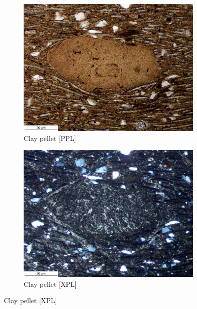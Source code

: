 \documentclass[a4paper]{article}
\begin{document}
\begin{figure}[H]
\begin{subfigure}[t]{.49\textwidth}
		\includegraphics[width=\textwidth]{ThinSections/55_10x_PPL.jpg}
		\caption{Clay pellet [PPL]}
	\end{subfigure}\hspace{.5em}\hfill
	\begin{subfigure}[t]{.49\textwidth}
		\includegraphics[width=\textwidth]{ThinSections/55_10x_XPL.jpg}
		\caption{Clay pellet [XPL]}
	\end{subfigure}\hspace{.5em}\hfill

\end{figure}
\end{document}
